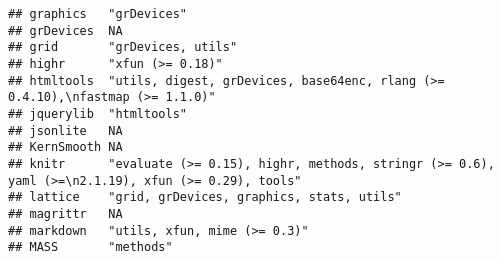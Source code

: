 \documentclass[
]{article}
\begin{document}
\begin{verbatim}
## graphics   "grDevices"                                                                                                                                                                                            
## grDevices  NA                                                                                                                                                                                                     
## grid       "grDevices, utils"                                                                                                                                                                                     
## highr      "xfun (>= 0.18)"                                                                                                                                                                                       
## htmltools  "utils, digest, grDevices, base64enc, rlang (>= 0.4.10),\nfastmap (>= 1.1.0)"                                                                                                                          
## jquerylib  "htmltools"                                                                                                                                                                                            
## jsonlite   NA                                                                                                                                                                                                     
## KernSmooth NA                                                                                                                                                                                                     
## knitr      "evaluate (>= 0.15), highr, methods, stringr (>= 0.6), yaml (>=\n2.1.19), xfun (>= 0.29), tools"                                                                                                       
## lattice    "grid, grDevices, graphics, stats, utils"                                                                                                                                                              
## magrittr   NA                                                                                                                                                                                                     
## markdown   "utils, xfun, mime (>= 0.3)"                                                                                                                                                                           
## MASS       "methods"                                                                                                                                                                                              

\end{verbatim}
\end{document}
